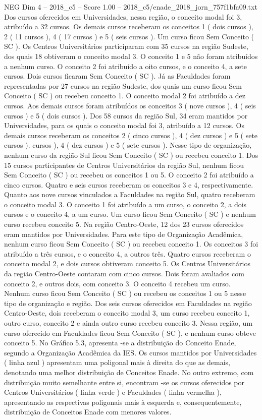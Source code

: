 \begin{textsample}{NEG Dim 4 – 2018\_c5 – Score 1.00 – 2018\_c5/enade\_2018\_jorn\_757f1bfa09.txt}
Dos cursos oferecidos em Universidades, nessa região, o conceito modal foi 3, atribuído a 32 cursos.
Os demais cursos receberam os conceitos 1 ( dois cursos ), 2 ( 11 cursos ), 4 ( 17 cursos ) e 5 ( seis cursos ).
Um curso ficou Sem Conceito ( SC ).
Os Centros Universitários participaram com 35 cursos na região Sudeste, dos quais 18 obtiveram o conceito modal 3.
O conceito 1 e 5 não foram atribuídos a nenhum curso.
O conceito 2 foi atribuído a oito cursos, e o conceito 4, a sete cursos.
Dois cursos ficaram Sem Conceito ( SC ).
Já as Faculdades foram representadas por 27 cursos na região Sudeste, dos quais um curso ficou Sem Conceito ( SC ) ou recebeu conceito 1.
O conceito modal 2 foi atribuído a dez cursos.
Aos demais cursos foram atribuídos os conceitos 3 ( nove cursos ), 4 ( seis cursos ) e 5 ( dois cursos ).
Dos 58 cursos da região Sul, 34 eram mantidos por Universidades, para os quais o conceito modal foi 3, atribuído a 12 cursos.
Os demais cursos receberam os conceitos 2 ( cinco cursos ), 4 ( dez cursos ) e 5 ( sete cursos ). cursos ), 4 ( dez cursos ) e 5 ( sete cursos ).
Nesse tipo de organização, nenhum curso da região Sul ficou Sem Conceito ( SC ) ou recebeu conceito 1.
Dos 15 cursos participantes de Centros Universitários da região Sul, nenhum ficou Sem Conceito ( SC ) ou recebeu os conceitos 1 ou 5.
O conceito 2 foi atribuído a cinco cursos.
Quatro e seis cursos receberam os conceitos 3 e 4, respectivamente.
Quanto aos nove cursos vinculados a Faculdades na região Sul, quatro receberam o conceito modal 3.
O conceito 1 foi atribuído a um curso, o conceito 2, a dois cursos e o conceito 4, a um curso.
Um curso ficou Sem Conceito ( SC ) e nenhum curso recebeu conceito 5.
Na região Centro-Oeste, 12 dos 23 cursos oferecidos eram mantidos por Universidades.
Para este tipo de Organização Acadêmica, nenhum curso ficou Sem Conceito ( SC ) ou recebeu conceito 1.
Os conceitos 3 foi atribuído a três cursos, e o conceito 4, a outros três.
Quatro cursos receberam o conceito modal 2, e dois cursos obtiveram conceito 5.
Os Centros Universitários da região Centro-Oeste contaram com cinco cursos.
Dois foram avaliados com conceito 2, e outros dois, com conceito 3.
O conceito 4 recebeu um curso.
Nenhum curso ficou Sem Conceito ( SC ) ou recebeu os conceitos 1 ou 5 nesse tipo de organização e região.
Dos seis cursos oferecidos em Faculdades na região Centro-Oeste, dois receberam o conceito modal 3, um curso recebeu conceito 1, outro curso, conceito 2 e ainda outro curso recebeu conceito 3.
Nessa região, um curso oferecido em Faculdades ficou Sem Conceito ( SC ), e nenhum curso obteve conceito 5.
No Gráfico 5.3, apresenta -se a distribuição do Conceito Enade, segundo a Organização Acadêmica da IES.
Os cursos mantidos por Universidades ( linha azul ) apresentam uma poligonal mais à direita do que as demais, denotando uma melhor distribuição de Conceitos Enade.
No outro extremo, com distribuição muito semelhante entre si, encontram -se os cursos oferecidos por Centros Universitários ( linha verde ) e Faculdades ( linha vermelha ), apresentando as respectivas poligonais mais à esquerda e, consequentemente, distribuição de Conceitos Enade com menores valores.

\end{textsample}
